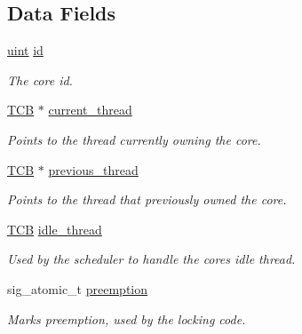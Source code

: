\subsection*{Data Fields}
\begin{DoxyCompactItemize}
\item 
\mbox{\label{structcore__control__block_a5208867f309bdd1656fd473f38b30bfe}} 
\hyperlink{bios_8h_a91ad9478d81a7aaf2593e8d9c3d06a14}{uint} \hyperlink{structcore__control__block_a5208867f309bdd1656fd473f38b30bfe}{id}
\begin{DoxyCompactList}\small\item\em The core id. \end{DoxyCompactList}\item 
\mbox{\label{structcore__control__block_aac649db5b9a99e693ed21c7e610834bf}} 
\hyperlink{group__scheduler_gaf88d9c946bf70b36a1e8bc34383abfc9}{T\+CB} $\ast$ \hyperlink{structcore__control__block_aac649db5b9a99e693ed21c7e610834bf}{current\+\_\+thread}
\begin{DoxyCompactList}\small\item\em Points to the thread currently owning the core. \end{DoxyCompactList}\item 
\mbox{\label{structcore__control__block_ae71bba6ddbd8709c51cd85efc3904a4e}} 
\hyperlink{group__scheduler_gaf88d9c946bf70b36a1e8bc34383abfc9}{T\+CB} $\ast$ \hyperlink{structcore__control__block_ae71bba6ddbd8709c51cd85efc3904a4e}{previous\+\_\+thread}
\begin{DoxyCompactList}\small\item\em Points to the thread that previously owned the core. \end{DoxyCompactList}\item 
\mbox{\label{structcore__control__block_a6dd29dab4a95ce740f45370345408c52}} 
\hyperlink{group__scheduler_gaf88d9c946bf70b36a1e8bc34383abfc9}{T\+CB} \hyperlink{structcore__control__block_a6dd29dab4a95ce740f45370345408c52}{idle\+\_\+thread}
\begin{DoxyCompactList}\small\item\em Used by the scheduler to handle the core\textquotesingle{}s idle thread. \end{DoxyCompactList}\item 
\mbox{\label{structcore__control__block_a858cde45d4478d73f60e839594b363f4}} 
sig\+\_\+atomic\+\_\+t \hyperlink{structcore__control__block_a858cde45d4478d73f60e839594b363f4}{preemption}
\begin{DoxyCompactList}\small\item\em Marks preemption, used by the locking code. \end{DoxyCompactList}\end{DoxyCompactItemize}


